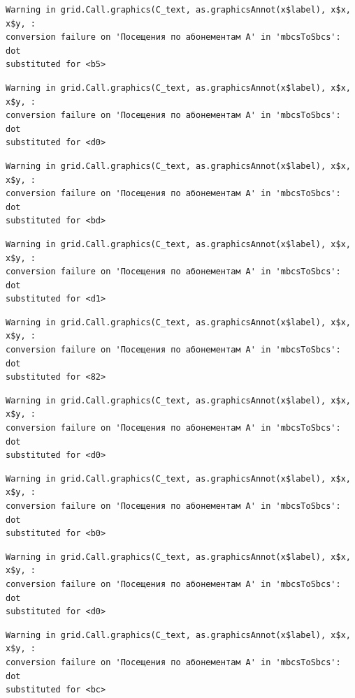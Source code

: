 \documentclass[
  letterpaper,
  DIV=11,
  numbers=noendperiod]{scrartcl}
\begin{document}
\begin{verbatim}
Warning in grid.Call.graphics(C_text, as.graphicsAnnot(x$label), x$x, x$y, :
conversion failure on 'Посещения по абонементам А' in 'mbcsToSbcs': dot
substituted for <b5>
\end{verbatim}

\begin{verbatim}
Warning in grid.Call.graphics(C_text, as.graphicsAnnot(x$label), x$x, x$y, :
conversion failure on 'Посещения по абонементам А' in 'mbcsToSbcs': dot
substituted for <d0>
\end{verbatim}

\begin{verbatim}
Warning in grid.Call.graphics(C_text, as.graphicsAnnot(x$label), x$x, x$y, :
conversion failure on 'Посещения по абонементам А' in 'mbcsToSbcs': dot
substituted for <bd>
\end{verbatim}

\begin{verbatim}
Warning in grid.Call.graphics(C_text, as.graphicsAnnot(x$label), x$x, x$y, :
conversion failure on 'Посещения по абонементам А' in 'mbcsToSbcs': dot
substituted for <d1>
\end{verbatim}

\begin{verbatim}
Warning in grid.Call.graphics(C_text, as.graphicsAnnot(x$label), x$x, x$y, :
conversion failure on 'Посещения по абонементам А' in 'mbcsToSbcs': dot
substituted for <82>
\end{verbatim}

\begin{verbatim}
Warning in grid.Call.graphics(C_text, as.graphicsAnnot(x$label), x$x, x$y, :
conversion failure on 'Посещения по абонементам А' in 'mbcsToSbcs': dot
substituted for <d0>
\end{verbatim}

\begin{verbatim}
Warning in grid.Call.graphics(C_text, as.graphicsAnnot(x$label), x$x, x$y, :
conversion failure on 'Посещения по абонементам А' in 'mbcsToSbcs': dot
substituted for <b0>
\end{verbatim}

\begin{verbatim}
Warning in grid.Call.graphics(C_text, as.graphicsAnnot(x$label), x$x, x$y, :
conversion failure on 'Посещения по абонементам А' in 'mbcsToSbcs': dot
substituted for <d0>
\end{verbatim}

\begin{verbatim}
Warning in grid.Call.graphics(C_text, as.graphicsAnnot(x$label), x$x, x$y, :
conversion failure on 'Посещения по абонементам А' in 'mbcsToSbcs': dot
substituted for <bc>
\end{verbatim}
\end{document}
